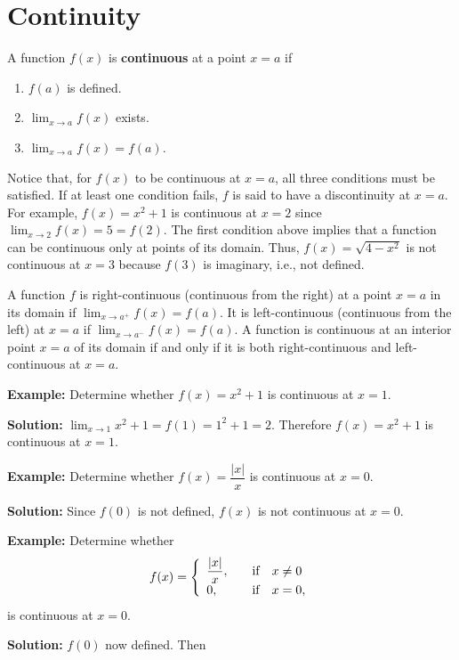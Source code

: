 \documentclass[titlepage,a4paper,12pt]{report}
\begin{document}
\section{Continuity}
A function $f(x)$ is \textbf{continuous} at a point $x=a$ if 
\begin{enumerate}
\item $f(a)$ is defined.
\item $\displaystyle \lim _{x\rightarrow a} f(x)$ exists.
\item $\displaystyle \lim _{x\rightarrow a} f(x) =f(a)$.
\end{enumerate}
Notice that, for $f(x)$  to be continuous at $x=a$, all three conditions must be satisfied. If at least one condition fails, $f$ is said to have a discontinuity at $x=a$. For example, $f(x)=x^2+1$ is continuous at $x=2$ since $\displaystyle \lim _{x\rightarrow 2} f(x)=5=f(2)$. The first condition above implies that a function can be continuous only at points of its domain. Thus, $f(x)=\sqrt{4-x^2}$ is not continuous at $x=3$ because $f(3)$ is imaginary, i.e., not defined.

\noindent A function $f$ is right-continuous (continuous from the right) at a point $x=a$ in its
domain if $\displaystyle \lim _{x\rightarrow a^+}f(x)=f(a)$. It is left-continuous (continuous from the left) at $x=a$ if $\displaystyle \lim _{x\rightarrow a^-}f(x)=f(a)$. A function is continuous at an interior point $x=a$ of its domain if and only if it is both right-continuous and left-continuous at $x=a$.

\noindent \textbf{Example:} Determine whether $f(x)=x^2+1$ is continuous at $x=1$.

\noindent \textbf{Solution:} $\displaystyle \lim _{x\rightarrow 1} x^2+1=f(1)=1^2+1=2$. Therefore $f(x)=x^2+1$ is continuous at $x=1$. 

\noindent \textbf{Example:} Determine whether $f(x)=\dfrac{|x|}{x}$ is continuous at $x=0$.

\noindent \textbf{Solution:} Since $f(0)$ is not defined, $f(x)$ is not continuous at $x=0$.

\noindent \textbf{Example:} Determine whether 
 \[f(x)= \left\{ 
\begin{array}{l l}
  \dfrac{|x|}{x}, & \quad \hbox{if}~~~ x\neq 0 \\
 0, & \quad \hbox{if}~~~ x=0,\\ \end{array} \right. \]
 is continuous at $x=0$.
 
 \noindent \textbf{Solution:} $f(0)$ now defined. Then 
 
\end{document}
